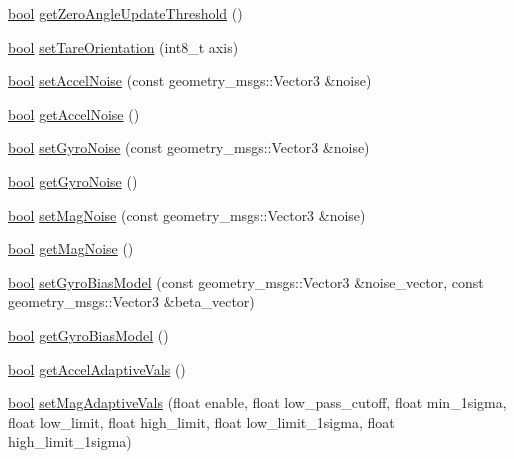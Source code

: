 \begin{DoxyCompactItemize}
\item 
\hyperlink{classbool}{bool} \hyperlink{classcl__microstrain__mips__client_1_1ClMicrostainMips_a6267c2a0d622a41228703a435959e736}{get\+Zero\+Angle\+Update\+Threshold} ()
\item 
\hyperlink{classbool}{bool} \hyperlink{classcl__microstrain__mips__client_1_1ClMicrostainMips_a0941653fe65dd115bf2a03c51292e573}{set\+Tare\+Orientation} (int8\+\_\+t axis)
\item 
\hyperlink{classbool}{bool} \hyperlink{classcl__microstrain__mips__client_1_1ClMicrostainMips_a6b4872d9f50f56794599ec0a33a1d128}{set\+Accel\+Noise} (const geometry\+\_\+msgs\+::\+Vector3 \&noise)
\item 
\hyperlink{classbool}{bool} \hyperlink{classcl__microstrain__mips__client_1_1ClMicrostainMips_aa2938123a61f8d7d8507fe9b9a5ff90e}{get\+Accel\+Noise} ()
\item 
\hyperlink{classbool}{bool} \hyperlink{classcl__microstrain__mips__client_1_1ClMicrostainMips_a5ae6ef234b6f53b83ebe6ad278db23ac}{set\+Gyro\+Noise} (const geometry\+\_\+msgs\+::\+Vector3 \&noise)
\item 
\hyperlink{classbool}{bool} \hyperlink{classcl__microstrain__mips__client_1_1ClMicrostainMips_ae1c74d9a73a9246d8da3fc30ec632f00}{get\+Gyro\+Noise} ()
\item 
\hyperlink{classbool}{bool} \hyperlink{classcl__microstrain__mips__client_1_1ClMicrostainMips_ab5639a2449d8b3bdd92ea2ca676a8912}{set\+Mag\+Noise} (const geometry\+\_\+msgs\+::\+Vector3 \&noise)
\item 
\hyperlink{classbool}{bool} \hyperlink{classcl__microstrain__mips__client_1_1ClMicrostainMips_a7e998d78fbe3a9632d373ab542ade536}{get\+Mag\+Noise} ()
\item 
\hyperlink{classbool}{bool} \hyperlink{classcl__microstrain__mips__client_1_1ClMicrostainMips_a73945e98f5fe79b821ec4991db9ec091}{set\+Gyro\+Bias\+Model} (const geometry\+\_\+msgs\+::\+Vector3 \&noise\+\_\+vector, const geometry\+\_\+msgs\+::\+Vector3 \&beta\+\_\+vector)
\item 
\hyperlink{classbool}{bool} \hyperlink{classcl__microstrain__mips__client_1_1ClMicrostainMips_ac5e298d64e998a7c59c7a23301a47f47}{get\+Gyro\+Bias\+Model} ()
\item 
\hyperlink{classbool}{bool} \hyperlink{classcl__microstrain__mips__client_1_1ClMicrostainMips_a0e8d0973621a462cfadfb1270b50ad0e}{get\+Accel\+Adaptive\+Vals} ()
\item 
\hyperlink{classbool}{bool} \hyperlink{classcl__microstrain__mips__client_1_1ClMicrostainMips_a3bef96ebee86eff98198f1a236b36118}{set\+Mag\+Adaptive\+Vals} (float enable, float low\+\_\+pass\+\_\+cutoff, float min\+\_\+1sigma, float low\+\_\+limit, float high\+\_\+limit, float low\+\_\+limit\+\_\+1sigma, float high\+\_\+limit\+\_\+1sigma)

\end{DoxyCompactItemize}
